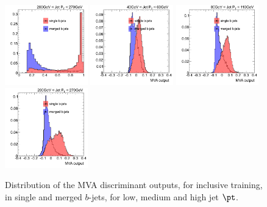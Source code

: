 \begin{figure}[tp]
\includegraphics[width=0.32\textwidth]{FIGS/TEMPFigs/MVA_differentMethods/inclusive/NNoutput200_MLP.pdf}
\includegraphics[width=0.32\textwidth]{FIGS/TEMPFigs/MVA_differentMethods/inclusive/NNoutput040_BDT.pdf}
\includegraphics[width=0.32\textwidth]{FIGS/TEMPFigs/MVA_differentMethods/inclusive/NNoutput080_BDT.pdf}
\includegraphics[width=0.32\textwidth]{FIGS/TEMPFigs/MVA_differentMethods/inclusive/NNoutput200_BDT.pdf}
\caption{Distribution of the MVA discriminant outputs, for inclusive training, in single and merged $b$-jets, for low, medium and high jet $\pt$.}
\label{fig:diffmethodsInclusive}
\end{figure}

